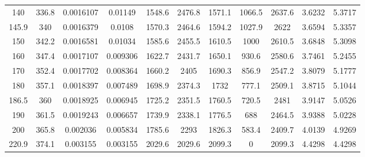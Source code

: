 \begin{longtable}{ccccccccccc}
140      & 336.8       & 0.0016107              & 0.01149             & 1548.6                 & 2476.8              & 1571.1          & 1066.5       & 2637.6       & 3.6232         & 5.3717      \\
145.9    & 340         & 0.0016379              & 0.0108              & 1570.3                 & 2464.6              & 1594.2          & 1027.9       & 2622         & 3.6594         & 5.3357      \\
150      & 342.2       & 0.0016581              & 0.01034             & 1585.6                 & 2455.5              & 1610.5          & 1000         & 2610.5       & 3.6848         & 5.3098      \\
160      & 347.4       & 0.0017107              & 0.009306            & 1622.7                 & 2431.7              & 1650.1          & 930.6        & 2580.6       & 3.7461         & 5.2455      \\
170      & 352.4       & 0.0017702              & 0.008364            & 1660.2                 & 2405                & 1690.3          & 856.9        & 2547.2       & 3.8079         & 5.1777      \\
180      & 357.1       & 0.0018397              & 0.007489            & 1698.9                 & 2374.3              & 1732            & 777.1        & 2509.1       & 3.8715         & 5.1044      \\
186.5    & 360         & 0.0018925              & 0.006945            & 1725.2                 & 2351.5              & 1760.5          & 720.5        & 2481         & 3.9147         & 5.0526      \\
190      & 361.5       & 0.0019243              & 0.006657            & 1739.9                 & 2338.1              & 1776.5          & 688          & 2464.5       & 3.9388         & 5.0228      \\
200      & 365.8       & 0.002036               & 0.005834            & 1785.6                 & 2293                & 1826.3          & 583.4        & 2409.7       & 4.0139         & 4.9269      \\
220.9    & 374.1       & 0.003155               & 0.003155            & 2029.6                 & 2029.6              & 2099.3          & 0            & 2099.3       & 4.4298         & 4.4298      \\
\bottomrule
\end{longtable}
